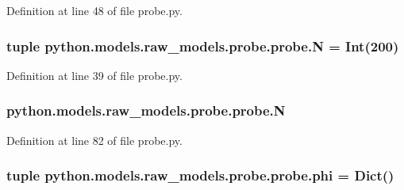 Definition at line 48 of file probe.\-py.

\hypertarget{classpython_1_1models_1_1raw__models_1_1probe_1_1probe_a79a4816dc01b9dec64a69f61c3bb3378}{
\subsubsection[{N}]{\setlength{\rightskip}{0pt plus 5cm}tuple python.\-models.\-raw\-\_\-models.\-probe.\-probe.\-N = Int(200)\hspace{0.3cm}{\ttfamily [static]}}}\label{classpython_1_1models_1_1raw__models_1_1probe_1_1probe_a79a4816dc01b9dec64a69f61c3bb3378}


Definition at line 39 of file probe.\-py.

\hypertarget{classpython_1_1models_1_1raw__models_1_1probe_1_1probe_a07568226668642c818ebd898c4051f25}{
\subsubsection[{N}]{\setlength{\rightskip}{0pt plus 5cm}python.\-models.\-raw\-\_\-models.\-probe.\-probe.\-N}}\label{classpython_1_1models_1_1raw__models_1_1probe_1_1probe_a07568226668642c818ebd898c4051f25}


Definition at line 82 of file probe.\-py.

\hypertarget{classpython_1_1models_1_1raw__models_1_1probe_1_1probe_aee37a5da5c849a3a242783da0cbe09f1}{
\subsubsection[{phi}]{\setlength{\rightskip}{0pt plus 5cm}tuple python.\-models.\-raw\-\_\-models.\-probe.\-probe.\-phi = Dict()\hspace{0.3cm}{\ttfamily [static]}}}\label{classpython_1_1models_1_1raw__models_1_1probe_1_1probe_aee37a5da5c849a3a242783da0cbe09f1}


